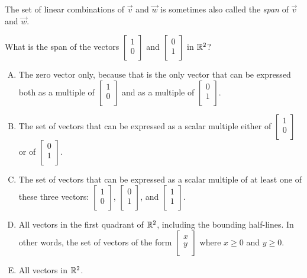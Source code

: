 \documentclass[10pt]{amsart}
\begin{document}
\begin{enumerate}
  The set of linear combinations of $\vec{v}$ and $\vec{w}$ is
  sometimes also called the {\em span} of $\vec{v}$ and $\vec{w}$.

  What is the span of the vectors $\left[\begin{matrix} 1 \\ 0
      \\\end{matrix}\right]$ and $\left[\begin{matrix} 0 \\ 1
      \\\end{matrix}\right]$ in $\mathbb{R}^2$?

  \begin{enumerate}[(A)]
  \item The zero vector only, because that is the only vector that can
    be expressed both as a multiple of $\left[\begin{matrix} 1 \\ 0
        \\\end{matrix}\right]$ and as a multiple of
    $\left[\begin{matrix} 0 \\ 1 \\\end{matrix}\right]$.
  \item The set of vectors that can be expressed as a scalar multiple
    either of $\left[\begin{matrix} 1 \\ 0 \\\end{matrix}\right]$ or
    of $\left[\begin{matrix} 0 \\ 1 \\\end{matrix}\right]$.
  \item The set of vectors that can be expressed as a scalar multiple
    of at least one of these three vectors: $\left[\begin{matrix} 1
        \\ 0 \\\end{matrix}\right]$, $\left[\begin{matrix} 0 \\ 1
        \\\end{matrix}\right]$, and $\left[\begin{matrix} 1 \\ 1
        \\\end{matrix}\right]$.
  \item All vectors in the first quadrant of $\mathbb{R}^2$, including the
    bounding half-lines. In other words, the set of vectors of the
    form $\left[\begin{matrix} x \\ y \\\end{matrix}\right]$ where $x
    \ge 0$ and $y \ge 0$.
  \item All vectors in $\mathbb{R}^2$.
  \end{enumerate}


\end{enumerate}
\end{document}
